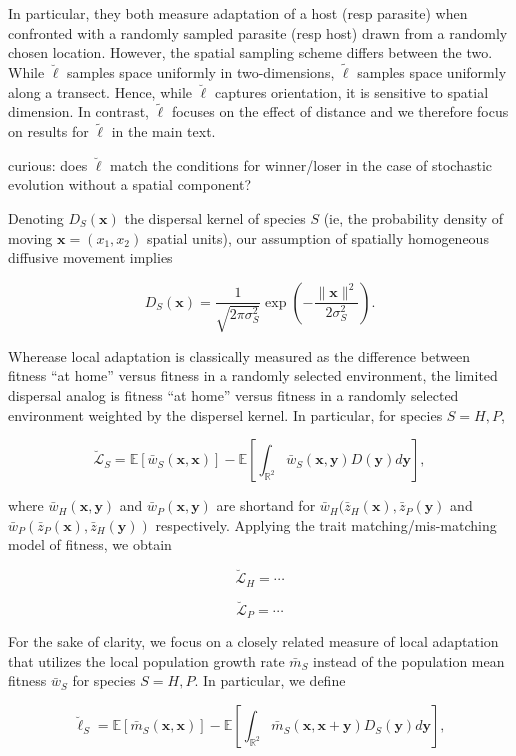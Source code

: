 \documentclass{article}
\begin{document}
In particular, they both measure adaptation of a host (resp parasite)
when confronted with a randomly sampled parasite (resp host) drawn from
a randomly chosen location. However, the spatial sampling scheme differs
between the two. While \(\breve{\ell}\) samples space uniformly in
two-dimensions, \(\tilde{\ell}\) samples space uniformly along a
transect. Hence, while \(\breve{\ell}\) captures orientation, it is
sensitive to spatial dimension. In contrast, \(\tilde{\ell}\) focuses on
the effect of distance and we therefore focus on results for
\(\tilde{\ell}\) in the main text.

curious: does \(\breve{\ell}\) match the conditions for winner/loser in
the case of stochastic evolution without a spatial component?

Denoting \(D_S(\pmb x)\) the dispersal kernel of species \(S\) (ie, the
probability density of moving \(\pmb x=(x_1,x_2)\) spatial units), our
assumption of spatially homogeneous diffusive movement implies

\[D_S(\pmb x)=\frac{1}{\sqrt{2\pi\sigma_S^2}}\exp\left(-\frac{\|\pmb x\|^2}{2\sigma_S^2}\right).\]

Wherease local adaptation is classically measured as the difference
between fitness ``at home'' versus fitness in a randomly selected
environment, the limited dispersal analog is fitness ``at home'' versus
fitness in a randomly selected environment weighted by the dispersel
kernel. In particular, for species \(S=H,P\),

\[\breve{\mathcal L}_S=\mathbb E[\bar w_S(\pmb x,\pmb x)]-\mathbb E\left[\int_{\mathbb R^2}\bar w_S(\pmb x,\pmb y)D(\pmb y)d\pmb y\right],\]

where \(\bar w_H(\pmb x,\pmb y)\) and \(\bar w_P(\pmb x,\pmb y)\) are
shortand for \(\bar w_H(\bar z_H(\pmb x),\bar z_P(\pmb y)\) and
\(\bar w_P(\bar z_P(\pmb x),\bar z_H(\pmb y))\) respectively. Applying
the trait matching/mis-matching model of fitness, we obtain

\[\breve{\mathcal L}_H=\cdots\]

\[\breve{\mathcal L}_P=\cdots\]

For the sake of clarity, we focus on a closely related measure of local
adaptation that utilizes the local population growth rate \(\bar m_S\)
instead of the population mean fitness \(\bar w_S\) for species
\(S=H,P\). In particular, we define

\[\breve\ell_S=\mathbb E[\bar m_S(\pmb x,\pmb x)]-\mathbb E\left[\int_{\mathbb R^2}\bar m_S(\pmb x,\pmb x+\pmb y)D_S(\pmb y)d\pmb y\right],\]
\end{document}
